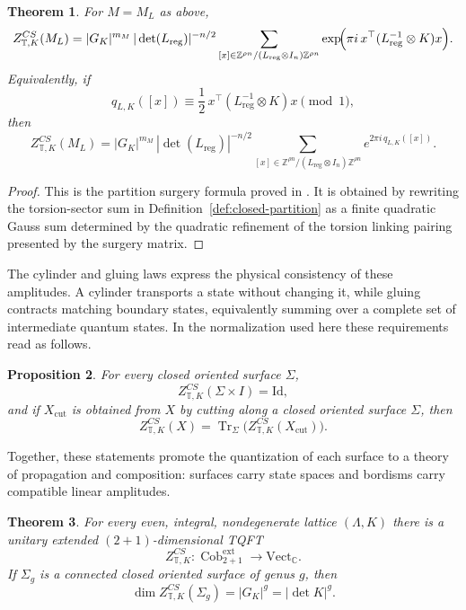 \documentclass[12pt]{amsart}
\numberwithin{equation}{section}
\newtheorem{theorem}{Theorem}[section]
\newtheorem{prop}[theorem]{Proposition}
\theoremstyle{definition}
\DeclareMathOperator{\Cob}{Cob}
\begin{document}
\begin{theorem}\cite[Theorem 4.8, Eq.~(4.14)]{Galviz3}
\label{thm:surgery-expression}
For $M=M_L$ as above,
$$
Z^{CS}_{\mathbb T,K}(M_L)
=
|G_K|^{m_M}\,
|\det(L_{\mathrm{reg}})|^{-n/2}
\sum_{[x]\in \mathbb Z^{\rho n}/(L_{\mathrm{reg}}\otimes I_n)\mathbb Z^{\rho n}}
\exp\!\Bigl(\pi i\,x^\top (L_{\mathrm{reg}}^{-1}\otimes K)x\Bigr).
$$
Equivalently, if
$$
q_{L,K}([x])\equiv \frac12\,x^\top(L_{\mathrm{reg}}^{-1}\otimes K)x \pmod 1,
$$
then
$$
Z^{CS}_{\mathbb T,K}(M_L)
=
|G_K|^{m_M}\,
|\det(L_{\mathrm{reg}})|^{-n/2}
\sum_{[x]\in \mathbb Z^{\rho n}/(L_{\mathrm{reg}}\otimes I_n)\mathbb Z^{\rho n}} e^{2\pi i\,q_{L,K}([x])}.
$$
\end{theorem}

\begin{proof}
This is the partition surgery formula proved in \cite{Galviz3}.  It is obtained by rewriting the torsion-sector sum in Definition~\ref{def:closed-partition} as a finite quadratic Gauss sum determined by the quadratic refinement of the torsion linking pairing presented by the surgery matrix.
\end{proof}

The cylinder and gluing laws express the physical consistency of these amplitudes. A cylinder transports a state without changing it, while gluing contracts matching boundary states, equivalently summing over a complete set of intermediate quantum states. In the normalization used here these requirements read as follows.

\begin{prop}\cite[Proposition 4.1 and Theorem 4.5]{Galviz2}
\label{prop:cylinder-gluing}
For every closed oriented surface $\Sigma$,
$$Z^{CS}_{\mathbb T,K}(\Sigma\times I)
=\mathrm{Id}, $$
 and if $X_{\mathrm{cut}}$ is obtained from $X$ by cutting along a closed oriented surface $\Sigma$, then
$$
Z^{CS}_{\mathbb T,K}(X)
=
\operatorname{Tr}_\Sigma\!\bigl(Z^{CS}_{\mathbb T,K}(X_{\mathrm{cut}})\bigr).
$$
\end{prop}


Together, these statements promote the quantization of each surface to a theory of propagation and composition: surfaces carry state spaces and bordisms carry compatible linear amplitudes.

\begin{theorem}\cite[Theorem 4.8]{Galviz2}
\label{thm:toral-cs}
For every even, integral, nondegenerate lattice $(\Lambda,K)$ there is a unitary extended $(2+1)$-dimensional TQFT
$$
Z^{CS}_{\mathbb T,K}:\Cob^{\mathrm{ext}}_{2+1}\longrightarrow \mathrm{Vect}_{\mathbb C}.
$$
If $\Sigma_g$ is a connected closed oriented surface of genus $g$, then
$$
\dim Z^{CS}_{\mathbb T,K}(\Sigma_g)=|G_K|^g=|\det K|^g.
$$
\end{theorem}
\end{document}
